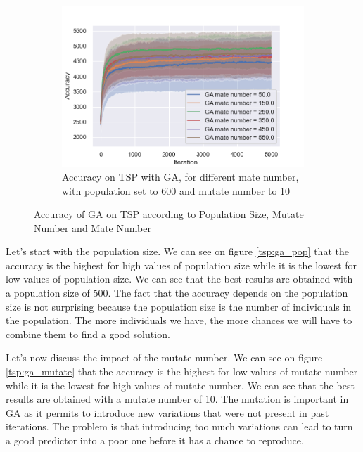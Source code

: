 \documentclass[twocolumn, 10pt]{article}
\begin{document}
\begin{figure}[h]
\begin{subfigure}[t]{0.32\columnwidth}
						\includegraphics[width=\linewidth]{../graphics/tsp_GA_Iteration_Error_GA_mate_number.png}
						\caption{Accuracy on TSP with GA, for different mate number, with population set to 600 and mutate number to 10}
						\label{tsp:ga_mate}
					\end{subfigure}
					\caption{Accuracy of GA on TSP according to Population Size, Mutate Number and Mate Number}
					\label{tsp:ga}
				\end{figure}

				Let's start with the population size. We can see on figure \ref{tsp:ga_pop} that the accuracy is the highest for high values of population size while it is the lowest for low values of population size. We can see that the best results are obtained with a population size of 500. The fact that the accuracy depends on the population size is not surprising because the population size is the number of individuals in the population. The more individuals we have, the more chances we will have to combine them to find a good solution.

				Let's now discuss the impact of the mutate number. We can see on figure \ref{tsp:ga_mutate} that the accuracy is the highest for low values of mutate number while it is the lowest for high values of mutate number. We can see that the best results are obtained with a mutate number of 10. The mutation is important in GA as it permits to introduce new variations that were not present in past iterations. The problem is that introducing too much variations can lead to turn a good predictor into a poor one before it has a chance to reproduce.
\end{document}
